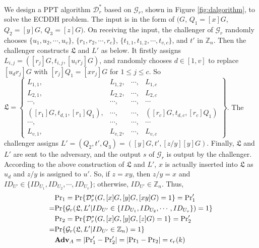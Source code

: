 {{{We design a PPT algorithm $\mathcal{D}^*_r$ based on $\mathcal{G}_r$, shown in Figure \ref{fig:dalgorithm}, to solve the ECDDH problem.
The input is in the form of $(G$, $Q_1=[x]G$, $Q_2=[y]G$, $Q_3=[z]G)$.
On receiving the input, the challenger of $\mathcal{G}_r$ randomly chooses
 $\{u_1, u_2, \cdots, u_v\}$, $\{r_1, r_2, \cdots, r_c\}$, $\{t_{1, 1}, t_{1, 2}, \cdots, t_{v, c}\}$, and $t'$ in $\mathbb{Z}_n$.
Then the challenger constructs $\mathfrak{L}$ and $L'$ as below.
It firstly assigns $L_{i, j} = ([r_j]G, t_{i, j}, [u_ir_j]G)$, %
    and randomly chooses $d \in [1, v]$ to
 replace $[u_d r_j]G$ with $[r_j]Q_1=[xr_j]G$ for $1\leq j \leq c$.
So $\mathfrak{L}=\left \{ \begin{matrix}
L_{1,1},&L_{1,2},&\cdots,&L_{1,c}\\
L_{2,1},& L_{2,2},&\cdots,&L_{2,c}\\
\cdots,&\cdots,&\cdots,&\cdots\\
([r_{1}]G, t_{d, 1}, [r_{1}]Q_1),&\cdots,&\cdots,&([r_{c}]G, t_{d, c}, [r_{c}]Q_1)\\
\cdots,&\cdots,&\cdots,&\cdots\\
L_{v,1},&L_{v,2},&\cdots,&L_{v,c}
\end{matrix}\right\}$.
%
The challenger assigns $L' = (Q_2, t', Q_3) = ([y]G, t', [z/y][y]G)$.
Finally,
    $\mathfrak{L}$ and $L'$ are sent to the adversary,
        and the output $s$ of $\mathcal{G}_r$ is output by the challenger.
According to the above construction of $\mathfrak{L}$ and $L'$,
    $x$ is actually inserted into $\mathfrak{L}$ as $u_d$
    and $z/y$ is assigned to $u'$.
So, if $z = xy$, then $z/y=x$ and $ID_{U'} \in \{ID_{U_1}, ID_{U_2}, \cdots, ID_{U_v}\}$;
    otherwise, $ID_{U'} \in \mathbb{Z}_n$.
Thus,
\begin{align*}
&{\rm Pr}_1={\rm Pr}\{\mathcal{D}^*_r(G, [x]G, [y]G, [xy]G)=1\}={\rm Pr}'_1 \\=&  {\rm Pr}\{\mathcal{G}_r(\mathfrak{L}, L'|ID_{U'} \in \{ID_{U_1}, ID_{U_2}, \cdots, ID_{U_v}\})=1\} \\
&{\rm Pr}_2={\rm Pr}\{\mathcal{D}^*_r(G, [x]G, [y]G, [z]G)=1\} ={\rm Pr}'_2 \\=&  {\rm Pr}\{\mathcal{G}_r(\mathfrak{L}, L'|ID_{U'} \in \mathbb{Z}_n)=1\}\\
&{\mathbf{Adv}}_{A}=|{\rm Pr}'_1-{\rm Pr}'_2|=|{\rm Pr}_1-{\rm Pr}_2|=\epsilon_{r}(k)
\end{align*}

}}}
